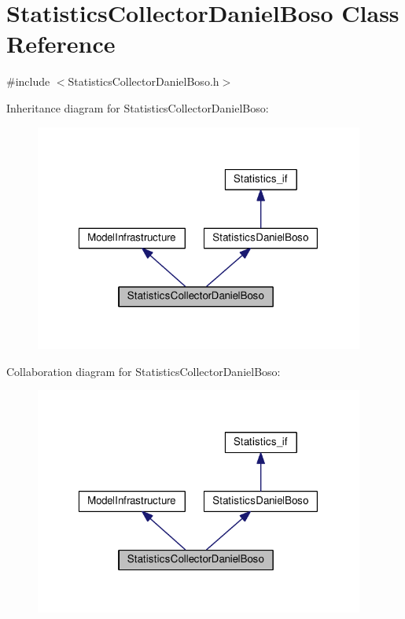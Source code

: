 \hypertarget{class_statistics_collector_daniel_boso}{\section{Statistics\-Collector\-Daniel\-Boso Class Reference}
\label{class_statistics_collector_daniel_boso}
}


{\ttfamily \#include $<$Statistics\-Collector\-Daniel\-Boso.\-h$>$}



Inheritance diagram for Statistics\-Collector\-Daniel\-Boso\-:
\nopagebreak
\begin{figure}[H]
\begin{center}
\leavevmode
\includegraphics[width=307pt]{class_statistics_collector_daniel_boso__inherit__graph}
\end{center}
\end{figure}


Collaboration diagram for Statistics\-Collector\-Daniel\-Boso\-:
\nopagebreak
\begin{figure}[H]
\begin{center}
\leavevmode
\includegraphics[width=307pt]{class_statistics_collector_daniel_boso__coll__graph}
\end{center}
\end{figure}
